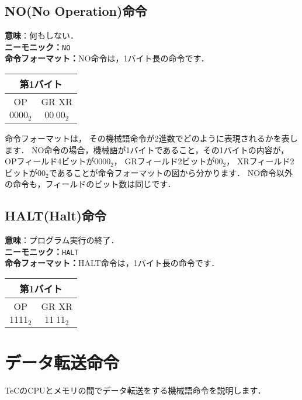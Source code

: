 \subsection{NO(No Operation)命令}
\begin{flushleft}
{\bf 意味}：何もしない． \\
{\bf ニーモニック：}{\tt NO} \\
{\bf 命令フォーマット：}NO命令は，1バイト長の命令です．
\end{flushleft}
\begin{center}
\begin{tabular}{|c|c|} \hline
\multicolumn{2}{|c|}{第1バイト} \\
\hline
OP & GR XR \\
\hline
$0000_2$ & $00~00_2$ \\
\hline
\end{tabular}
\end{center}
命令フォーマットは，
その機械語命令が2進数でどのように表現されるかを表します．
NO命令の場合，機械語が1バイトであること，その1バイトの内容が，
OPフィールド4ビットが$0000_2$，
GRフィールド2ビットが$00_2$，
XRフィールド2ビットが$00_2$であることが命令フォーマットの図から分かります．
NO命令以外の命令も，フィールドのビット数は同じです．

\subsection{HALT(Halt)命令}
\begin{flushleft}
{\bf 意味}：プログラム実行の終了． \\
{\bf ニーモニック：}{\tt HALT} \\
{\bf 命令フォーマット：}HALT命令は，1バイト長の命令です．
\end{flushleft}
\begin{center}
\begin{tabular}{|c|c|} \hline
\multicolumn{2}{|c|}{第1バイト} \\
\hline
OP & GR XR \\
\hline
$1111_2$ & $11~11_2$ \\
\hline
\end{tabular}
\end{center}

\newpage
\section{データ転送命令}
TeCのCPUとメモリの間でデータ転送をする機械語命令を説明します．

